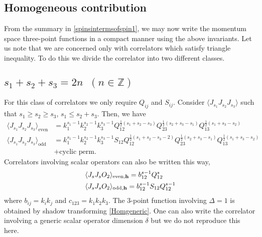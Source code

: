\documentclass[a4paper,11pt]{article}
\begin{document}
\subsection*{Homogeneous contribution}
From the summary in \ref{spinsintermsofspin1},
 we may now write the momentum space three-point functions in a compact manner using the above invariants. Let us note that we are concerned only with correlators which satisfy triangle inequality. To do this we divide the correlator into two different classes.
 \subsection*{$s_1+s_2+s_3=2n\;\;(n \in \mathbb{Z})$}
 For this class of correlators we only require $Q_{ij}$ and $S_{ij}.$ 
 Consider $\langle J_{s_1}J_{s_2}J_{s_3} \rangle$ such that $s_1 \geq s_2 \geq s_3$, $s_1 \leq s_2+s_3$.  Then, we have
\begin{align}
    \langle J_{s_1} J_{s_2}J_{s_3} \rangle_{\text{even}} &= k_1^{s_1-1}k_2^{s_2-1}k_3^{s_3-1}Q_{12}^{\frac{1}{2}(s_1+s_2-s_3)}Q_{23}^{\frac{1}{2}(s_2+s_3-s_1)}Q_{13}^{\frac{1}{2}(s_1+s_3-s_2)}\nonumber\\[5 pt]
   \langle J_{s_1} J_{s_2}J_{s_3} \rangle_{\text{odd}} &= k_1^{s_1-1}k_2^{s_2-1}k_3^{s_3-1}S_{12}Q_{12}^{\frac{1}{2}(s_1+s_2-s_3-2)}Q_{23}^{\frac{1}{2}(s_2+s_3-s_1)}Q_{13}^{\frac{1}{2}(s_1+s_3-s_2)}\nonumber\\[5 pt]
   &+\text{cyclic perm.}
\end{align}
Correlators involving scalar operators can also be written this way,
\begin{align}\label{Homgeneric}
   &\langle J_sJ_sO_2\rangle_{\text{even}, \bf{h}} = b_{12}^{s-1}Q^s_{12}\\
   &\langle J_sJ_sO_2\rangle_{\text{odd}, \bf{h}} = b_{12}^{s-1}S_{12}Q^{s-1}_{12}
\end{align}
where $b_{ij}=k_i k_j$ and $c_{123}=k_1 k_2 k_3$.  The 3-point function involving $\Delta=1$ is obtained by shadow transforming \eqref{Homgeneric}. One can also write the correlator involving a generic scalar operator dimension $\delta$ but we do not reproduce this here.
\par


\end{document}
